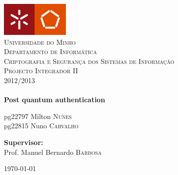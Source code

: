 \begin{titlepage}

\begin{center}

\includegraphics[width=0.25\textwidth]{img/um-eng}\\[1cm]

\textsc{\LARGE Universidade do Minho\\Departamento de Informática}\\[1cm]

\textsc{\Large Criptografia e Segurança dos Sistemas de Informação}\\[0.5cm]
\textsc{\Large Projecto Integrador II\\2012/2013}\\[0.25cm]


\HRule \\[0.4cm]
{ \huge \bfseries Post quantum authentication}
\HRule \\[1.5cm]
%
\begin{minipage}[t]{0.4\textwidth}
\begin{flushleft} \large
pg22797 Milton \textsc{Nunes}\\
pg22815 Nuno \textsc{Carvalho}\\
\end{flushleft}
\end{minipage}
\begin{minipage}[t]{0.4\textwidth}
\begin{flushright} \large
\textbf{Supervisor:}\\
Prof. Manuel Bernardo \textsc{Barbosa}
\end{flushright}
\end{minipage}

\vfill


{\large \today}

\end{center}
\end{titlepage}

